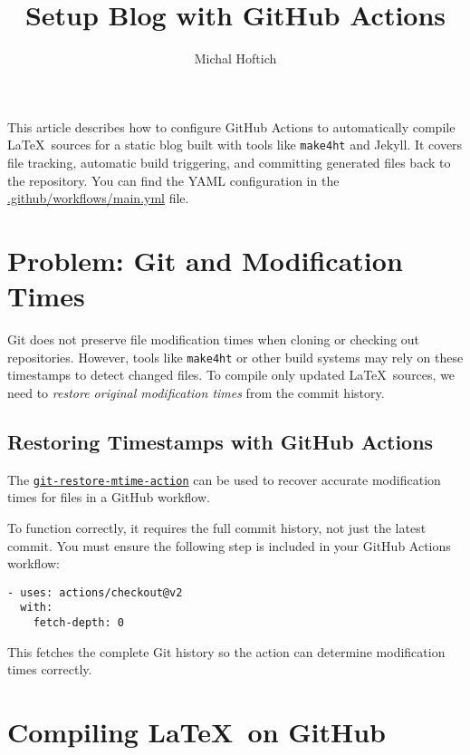 \documentclass{article}
\title{Setup Blog with GitHub Actions}
\author{Michal Hoftich}
\def\makeht{\texttt{make4ht}}
\begin{document}
\maketitle

This article describes how to configure GitHub Actions to automatically compile \LaTeX\ sources
for a static blog built with tools like \makeht{} and Jekyll. It covers file tracking,
automatic build triggering, and committing generated files back to the repository.
You can find the YAML configuration in the
\href{https://github.com/michal-h21/testblog/blob/main/.github/workflows/main.yml}{.github/workflows/main.yml}
file.


\tableofcontents

\section{Problem: Git and Modification Times}

Git does not preserve file modification times when cloning or checking out repositories.  
However, tools like \makeht{} or other build systems may rely on these timestamps to detect changed files.  
To compile only updated \LaTeX\ sources, we need to \textit{restore original modification times}
from the commit history.

\subsection{Restoring Timestamps with GitHub Actions}

The \href{https://github.com/chetan/git-restore-mtime-action}{\texttt{git-restore-mtime-action}} 
can be used to recover accurate modification times for files in a GitHub workflow.

To function correctly, it requires the full commit history, not just the latest commit.
You must ensure the following step is included in your GitHub Actions workflow:

\begin{verbatim}
- uses: actions/checkout@v2
  with:
    fetch-depth: 0
\end{verbatim}

This fetches the complete Git history so the action can determine modification times correctly.

\section{Compiling \LaTeX\ on GitHub}
\end{document}
